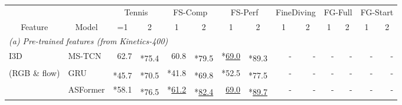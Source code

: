 \documentclass[runningheads]{llncs}
\newcommand{\OURMETHOD}{{E2E-Spot}\xspace}
\newcommand{\fscomp}{{FS-Comp}\xspace}
\newcommand{\fsperf}{{FS-Perf}\xspace}
\newcommand{\tennis}{{Tennis}\xspace}
\newcommand{\finediving}{{FineDiving}\xspace}
\newcommand{\best}[1]{\underline{#1}}
\newcommand{\sota}[1]{\textbf{#1}}
\newcommand{\nms}{\textsuperscript{\textdagger}}
\newcommand{\loss}{*}
\begin{document}
\renewcommand{\tabcolsep}{0.05cm}
\begin{table*}[t]
    \caption{{\bf Spotting performance (mAP @  frames).}
The top results in each category and each column are \best{underlined}.
SOTA is \sota{bold}.
We report best results under the following: \textdagger~indicates NMS; * indicates CALF~\cite{calf} or dilation.
(e) \OURMETHOD, trained with RGB only, generally outperforms the non-pose baselines and is competitive with the pose baselines on Figure Skating.
\OURMETHOD can further be improved with a larger 800MF CNN and a 2-stream ensemble with flow.
    }
    \label{tab:frame_accurate_results}
    {
    \tiny
    \centering
    \begin{tabularx}{\textwidth}{ll
        rr
        rr
        rr
        rr
        rr
        rr
    }
        \toprule
        &
            & \multicolumn{2}{c}{\tennis}
            & \multicolumn{2}{c}{\fscomp}
            & \multicolumn{2}{c}{\fsperf}
            & \multicolumn{2}{c}{\finediving}
            & \multicolumn{2}{c}{FG-Full}
            & \multicolumn{2}{c}{FG-Start}
            \\
        \multicolumn{1}{c}{Feature} & \multicolumn{1}{c}{Model}
            & \multicolumn{1}{c}{=1}
            & \multicolumn{1}{c}{2}
            & \multicolumn{1}{c}{1}
            & \multicolumn{1}{c}{2}
            & \multicolumn{1}{c}{1}
            & \multicolumn{1}{c}{2}
            & \multicolumn{1}{c}{1}
            & \multicolumn{1}{c}{2}
            & \multicolumn{1}{c}{1}
            & \multicolumn{1}{c}{2}
            & \multicolumn{1}{c}{1}
            & \multicolumn{1}{c}{2}
            \\
        \midrule
        \multicolumn{12}{l}{\em(a) Pre-trained features (from Kinetics-400)} \\
I3D~\cite{i3d}
        & MS-TCN
            & 62.7 & \nms \loss75.4
            & 60.8 & \nms \loss79.5
            & \loss \best{69.0} & \nms\loss 89.3
            & - & -
            & - & -
            & - & -
            \\

        (RGB \& flow)
        & GRU
            & \nms \loss 45.7 & \nms \loss 70.5
            & \loss 41.8 & \nms \loss69.8
            & \loss 52.5 & \nms \loss77.5
            & - & -
            & - & -
            & - & -
            \\

        & ASFormer
            & \loss 58.1 & \nms\loss 76.5
            & \loss \best{61.2} & \nms\loss \best{82.4}
            & \best{69.0} & \nms\loss \best{89.7}
            & - & -
            & - & -
            & - & -
            \\


\end{tabularx}}
\end{table*}
\end{document}
